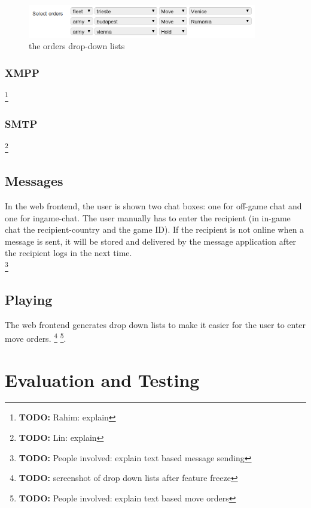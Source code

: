 \documentclass[11pt,a4paper]{report}
\newcommand{\hi}[1]{{\color{red}\em #1\/}\\}
\newcommand{\todo}[1]{\footnote{{\color{red} {\bf TODO:} #1}}}
\begin{document}
\begin{figure}[h]
 \centering
 \includegraphics[width=10cm]{./graphics/orderssmall.png}
 \caption{the orders drop-down lists}
 \label{fig:orders}
\end{figure}


\subsection{XMPP}
\todo{Rahim: explain}
\subsection{SMTP}
\todo{Lin: explain}
\section{Messages}
In the web frontend, the user is shown two chat boxes: one for off-game chat
and one for ingame-chat. The user manually has to enter the recipient (in
in-game chat the recipient-country and the game ID). If the recipient is not
online when a message is sent, it will be stored and delivered by the message
application after the recipient logs in the next time. \\
\todo{People involved: explain text based message sending}

\section{Playing}
The web frontend generates drop down lists to make it easier for the user to
enter move orders. \todo{screenshot of drop down lists after feature freeze}
\todo{People involved: explain text based move orders}.

\chapter{Evaluation and Testing}
\end{document}
